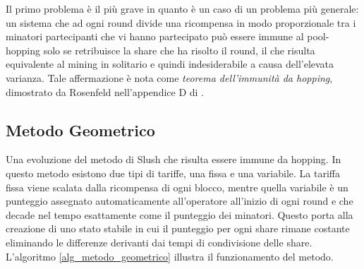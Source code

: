 Il primo problema è il più grave in quanto è un caso di un problema più generale: un sistema che ad ogni round divide una ricompensa in modo proporzionale tra i minatori partecipanti che vi hanno partecipato può essere immune al pool-hopping solo se retribuisce la share che ha risolto il round, il che risulta equivalente al mining in solitario e quindi indesiderabile a causa dell'elevata varianza. Tale affermazione è nota come \emph{teorema dell'immunità da hopping}, dimostrato da Rosenfeld nell'appendice D di \cite{pool-analysis}.

\subsection{Metodo Geometrico}

Una evoluzione del metodo di Slush che risulta essere immune da hopping.
In questo metodo esistono due tipi di tariffe, una fissa e una variabile. La tariffa fissa viene scalata dalla ricompensa di ogni blocco, mentre quella variabile è un punteggio assegnato automaticamente all'operatore all'inizio di ogni round e che decade nel tempo esattamente come il punteggio dei minatori.
Questo porta alla creazione di uno stato stabile in cui il punteggio per ogni share rimane costante eliminando le differenze derivanti dai tempi di condivisione delle share. L'algoritmo \ref{alg_metodo_geometrico} illustra il funzionamento del metodo.



